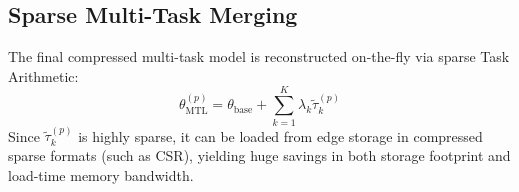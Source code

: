 \subsection{Sparse Multi-Task Merging}
The final compressed multi-task model is reconstructed on-the-fly via sparse Task Arithmetic:
\begin{equation}
\theta_{\text{MTL}}^{(p)} = \theta_{\text{base}} + \sum_{k=1}^K \lambda_k \tilde{\tau}_k^{(p)}
\end{equation}
Since $\tilde{\tau}_k^{(p)}$ is highly sparse, it can be loaded from edge storage in compressed sparse formats (such as CSR), yielding huge savings in both storage footprint and load-time memory bandwidth.